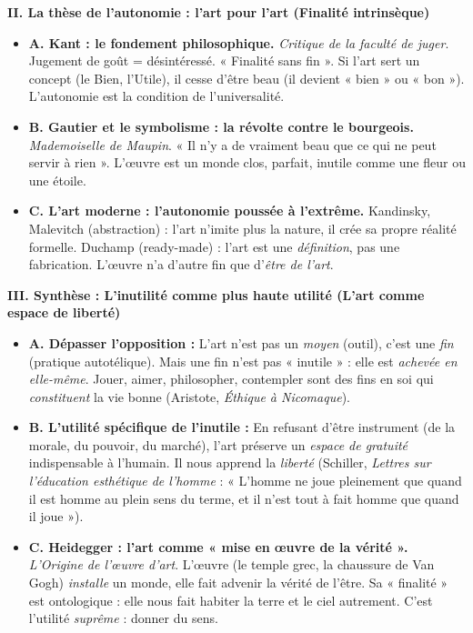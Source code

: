 \documentclass[11pt]{article}
\begin{document}
\begin{exoresolu}
\textbf{II. La thèse de l'autonomie : l'art pour l'art (Finalité intrinsèque)}
\begin{itemize}
    \item \textbf{A. Kant : le fondement philosophique.} \emph{Critique de la faculté de juger}. Jugement de goût = désintéressé. « Finalité sans fin ». Si l'art sert un concept (le Bien, l'Utile), il cesse d'être beau (il devient « bien » ou « bon »). L'autonomie est la condition de l'universalité.
    \item \textbf{B. Gautier et le symbolisme : la révolte contre le bourgeois.} \emph{Mademoiselle de Maupin}. « Il n'y a de vraiment beau que ce qui ne peut servir à rien ». L'œuvre est un monde clos, parfait, inutile comme une fleur ou une étoile.
    \item \textbf{C. L'art moderne : l'autonomie poussée à l'extrême.} Kandinsky, Malevitch (abstraction) : l'art n'imite plus la nature, il crée sa propre réalité formelle. Duchamp (ready-made) : l'art est une \emph{définition}, pas une fabrication. L'œuvre n'a d'autre fin que d'\emph{être de l'art}.
\end{itemize}

\textbf{III. Synthèse : L'inutilité comme plus haute utilité (L'art comme espace de liberté)}
\begin{itemize}
    \item \textbf{A. Dépasser l'opposition :} L'art n'est pas un \emph{moyen} (outil), c'est une \emph{fin} (pratique autotélique). Mais une fin n'est pas « inutile » : elle est \emph{achevée en elle-même}. Jouer, aimer, philosopher, contempler sont des fins en soi qui \emph{constituent} la vie bonne (Aristote, \emph{Éthique à Nicomaque}).
    \item \textbf{B. L'utilité spécifique de l'inutile :} En refusant d'être instrument (de la morale, du pouvoir, du marché), l'art préserve un \emph{espace de gratuité} indispensable à l'humain. Il nous apprend la \emph{liberté} (Schiller, \emph{Lettres sur l'éducation esthétique de l'homme} : « L'homme ne joue pleinement que quand il est homme au plein sens du terme, et il n'est tout à fait homme que quand il joue »).
    \item \textbf{C. Heidegger : l'art comme « mise en œuvre de la vérité ».} \emph{L'Origine de l'œuvre d'art}. L'œuvre (le temple grec, la chaussure de Van Gogh) \emph{installe} un monde, elle fait advenir la vérité de l'être. Sa « finalité » est ontologique : elle nous fait habiter la terre et le ciel autrement. C'est l'utilité \emph{suprême} : donner du sens.
\end{itemize}


\end{exoresolu}
\end{document}
